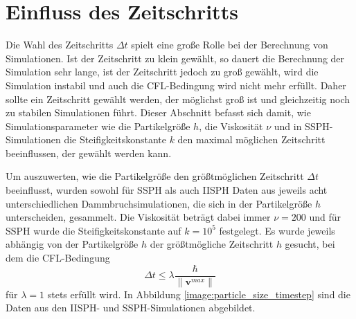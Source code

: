 \documentclass{scrreprt}
\begin{document}
\section{Einfluss des Zeitschritts}
Die Wahl des Zeitschritts $\Delta t$ spielt eine große Rolle bei der Berechnung von Simulationen.
Ist der Zeitschritt zu klein gewählt, so dauert die Berechnung der Simulation sehr lange,
ist der Zeitschritt jedoch zu groß gewählt, wird die Simulation instabil und auch die CFL-Bedingung wird nicht mehr erfüllt.
Daher sollte ein Zeitschritt gewählt werden, der möglichst groß ist und gleichzeitig noch zu stabilen Simulationen führt.
Dieser Abschnitt befasst sich damit,
wie Simulationsparameter wie die Partikelgröße $h$, die Viskosität $\nu$ und in SSPH-Simulationen die Steifigkeitskonstante $k$
den maximal möglichen Zeitschritt beeinflussen, der gewählt werden kann.

Um auszuwerten, wie die Partikelgröße den größtmöglichen Zeitschritt $\Delta t$ beeinflusst,
wurden sowohl für SSPH als auch IISPH Daten aus jeweils acht unterschiedlichen Dammbruchsimulationen, die sich in der Partikelgröße $h$ unterscheiden, gesammelt.
Die Viskosität beträgt dabei immer $\nu = 200$ und für SSPH wurde die Steifigkeitskonstante auf $k = 10^5$ festgelegt.
Es wurde jeweils abhängig von der Partikelgröße $h$ der größtmögliche Zeitschritt $h$ gesucht, bei dem die CFL-Bedingung
\begin{equation}
    \Delta t \leq \lambda \frac{\hbar}{\|\textbf{v}^{max}\| }
\end{equation}
für $\lambda = 1$ stets erfüllt wird.
In Abbildung \ref{image:particle_size_timestep} sind die Daten aus den IISPH- und SSPH-Simulationen abgebildet.
\end{document}
